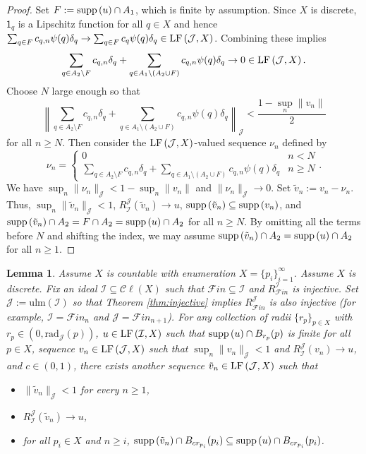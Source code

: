 \documentclass[12pt]{amsart}
\newtheorem{lemma}[theorem]{Lemma}
\theoremstyle{definition}
\numberwithin{equation}{section}
\def \F {\mathcal{F}in}
\def \I {\mathcal{I}}
\def \J {\mathcal{J}}
\def \sbs {\subseteq}
\def \one {\mathsf{1}}
\newcommand{\Cl}[1]{\mathcal{C}\ell\left(#1\right)}
\newcommand{\rad}[2]{\mathrm{rad}_{#1}\left(#2\right)}
\newcommand{\ulm}[1]{\mathrm{ulm}\left(#1\right)}
\begin{document}
\begin{proof}
Set $F := \supp{u} \cap A_1$, which is finite by assumption. Since $X$ is discrete, $\one_q$ is a Lipschitz function for all $q \in X$ and hence $\sum_{q \in F} c_{q,n}\psi(q)\delta_q \to \sum_{q \in F} c_{q}\psi(q)\delta_q \in \LF{\J}{X}$. Combining these implies
$$\sum_{q \in A_2 \setminus F} c_{q,n}\delta_{q} + \sum_{q \in A_1 \setminus (A_2 \cup F)} c_{q,n}\psi(q)\delta_q \to 0 \in \LF{\J}{X}.$$
Choose $N$ large enough so that
$$\left\| \sum_{q \in A_2 \setminus F} c_{q,n}\delta_{q} + \sum_{q \in A_1 \setminus (A_2 \cup F)} c_{q,n}\psi(q)\delta_q \right\|_\J < \frac{1 - \sup_n \|v_n\|}{2}$$
for all $n \geq N$. Then consider the $\LF{\J}{X}$-valued sequence $\nu_n$ defined by
$$\nu_n = \left\{\begin{matrix} 0 & n < N \\ \sum_{q \in A_2 \setminus F} c_{q,n}\delta_{q} + \sum_{q \in A_1 \setminus (A_2 \cup F)} c_{q,n}\psi(q)\delta_q & n \geq N \end{matrix}\right..$$
We have $\sup_n \|\nu_n\|_\J < 1 - \sup_n \|v_n\|$ and $\|\nu_n\|_\J \to 0$. Set $\tilde{v}_n := v_n - \nu_n$. Thus, $\sup_n \|\tilde{v}_n\|_\J < 1$, $R^\J_\I(\tilde{v}_n) \to u$, $\supp{\tilde{v}_n} \sbs \supp{v_n}$, and $\supp{\tilde{v}_n} \cap A_2 = F \cap A_2 = \supp{u} \cap A_2$ for all $n \geq N$. By omitting all the terms before $N$ and shifting the index, we may assume $\supp{\tilde{v}_n} \cap A_2 = \supp{u} \cap A_2$ for all $n \geq 1$.
\end{proof}

\begin{lemma} \label{lem:sequence2}
Assume $X$ is countable with enumeration $X = \{p_i\}_{i=1}^\infty$. Assume $X$ is discrete. Fix an ideal $\I \sbs \Cl{X}$ such that $\F \sbs \I$ and $R^\I_{\F}$ is injective. Set $\J := \ulm{\I}$ so that Theorem \ref{thm:injective} implies $R^\J_{\F}$ is also injective (for example, $\I = \F_n$ and $\J = \F_{n+1}$). For any collection of radii $\{r_p\}_{p \in X}$ with $r_p \in (0,\rad{\J}{p})$, $u \in \LF{\I}{X}$ such that $\supp{u} \cap B_{r_p}(p)$ is finite for all $p \in X$, sequence $v_n \in \LF{\J}{X}$ such that $\sup_n \|v_n\|_\J < 1$ and $R^\J_\I(v_n) \to u$, and $c \in (0,1)$, there exists another sequence $\tilde{v}_n \in \LF{\J}{X}$ such that
\begin{itemize}
\item $\|\tilde{v}_n\|_\J < 1$ for every $n \geq 1$,
\item $R^\J_\I(\tilde{v}_n) \to u$,
\item for all $p_i \in X$ and $n \geq i$, $\supp{\tilde{v}_n} \cap B_{cr_{p_i}}(p_i) \sbs \supp{u} \cap B_{cr_{p_i}}(p_i)$.
\end{itemize}
\end{lemma}
\end{document}
